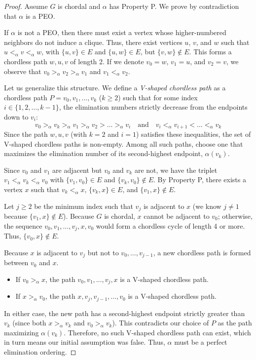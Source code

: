 \begin{proof}
Assume $G$ is chordal and $\alpha$ has Property P. We prove by contradiction that $\alpha$ is a PEO. 

If $\alpha$ is not a PEO, then there must exist a vertex whose higher-numbered neighbors do not induce a clique. Thus, there exist vertices $u$, $v$, and $w$ such that $u <_\alpha v <_\alpha w$, with $\{u, v\} \in E$ and $\{u, w\} \in E$, but $\{v, w\} \notin E$. This forms a chordless path $w, u, v$ of length 2. If we denote $v_0 = w$, $v_1 = u$, and $v_2 = v$, we observe that $v_0 >_\alpha v_2 >_\alpha v_1$ and $v_1 <_\alpha v_2$.

Let us generalize this structure. We define a \textit{V-shaped chordless path} as a chordless path $P = v_0, v_1, \dots, v_k$ ($k \ge 2$) such that for some index \\ $i \in \{1, 2, \ldots, k-1\}$, the elimination numbers strictly decrease from the endpoints down to $v_i$:
\[ v_0 >_\alpha v_k >_\alpha v_1 >_\alpha v_2 > \dots >_\alpha v_i \quad \text{and} \quad v_i <_\alpha v_{i+1} < \dots <_\alpha v_k \]
Since the path $w, u, v$ (with $k=2$ and $i=1$) satisfies these inequalities, the set of V-shaped chordless paths is non-empty. Among all such paths, choose one that maximizes the elimination number of its second-highest endpoint, $\alpha(v_k)$.

Since $v_0$ and $v_1$ are adjacent but $v_0$ and $v_k$ are not, we have the triplet $v_1 <_\alpha v_k <_\alpha v_0$ with $\{v_1, v_0\} \in E$ and $\{v_k, v_0\} \notin E$. By Property P, there exists a vertex $x$ such that $v_k <_\alpha x$, $\{v_k, x\} \in E$, and $\{v_1, x\} \notin E$. 

Let $j \ge 2$ be the minimum index such that $v_j$ is adjacent to $x$ (we know $j \neq 1$ because $\{v_1, x\} \notin E$). Because $G$ is chordal, $x$ cannot be adjacent to $v_0$; otherwise, the sequence $v_0, v_1, \dots, v_j, x, v_0$ would form a chordless cycle of length 4 or more. Thus, $\{v_0, x\} \notin E$. 

Because $x$ is adjacent to $v_j$ but not to $v_0, \dots, v_{j-1}$, a new chordless path is formed between $v_0$ and $x$. 
\begin{itemize}
    \item If $v_0 >_\alpha x$, the path $v_0, v_1, \dots, v_j, x$ is a V-shaped chordless path.
    \item If $x >_\alpha v_0$, the path $x, v_j, v_{j-1}, \dots, v_0$ is a V-shaped chordless path.
\end{itemize}
In either case, the new path has a second-highest endpoint strictly greater than $v_k$ (since both $x >_\alpha v_k$ and $v_0 >_\alpha v_k$). This contradicts our choice of $P$ as the path maximizing $\alpha(v_k)$. Therefore, no such V-shaped chordless path can exist, which in turn means our initial assumption was false. Thus, $\alpha$ must be a perfect elimination ordering.
\end{proof}